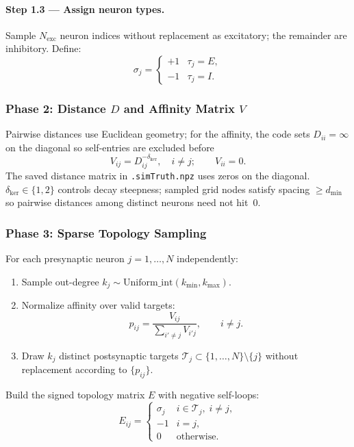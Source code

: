 \documentclass[11pt]{article}
\begin{document}
\paragraph{Step 1.3 --- Assign neuron types.}
Sample $N_{\text{exc}}$ neuron indices without replacement as
excitatory; the remainder are inhibitory. Define:
\begin{equation}
  \sigma_j =
  \begin{cases} +1 & \tau_j=E,\\ -1 & \tau_j=I.\end{cases}
\end{equation}

\subsubsection{Phase 2: Distance $D$ and Affinity Matrix $V$}

Pairwise distances use Euclidean geometry; for the affinity, the
code sets $D_{ii}=\infty$ on the diagonal so self-entries are excluded
before
\begin{equation}
  V_{ij}=D_{ij}^{-\delta_{\mathrm{ker}}},\quad i\neq j;\qquad
  V_{ii}=0.
  \label{eq:dist_kernel}
\end{equation}
The saved distance matrix in \texttt{.simTruth.npz} uses zeros on the
diagonal.
$\delta_{\mathrm{ker}}\in\{1,2\}$ controls decay steepness; sampled
grid nodes satisfy spacing $\ge d_{\text{min}}$ so pairwise distances
among distinct neurons need not hit~$0$.

\subsubsection{Phase 3: Sparse Topology Sampling}

For each presynaptic neuron $j=1,\dots,N$ independently:
\begin{enumerate}
  \item Sample out-degree
        $k_j\sim\mathrm{Uniform\_int}(k_{\text{min}},k_{\text{max}})$.
  \item Normalize affinity over valid targets:
  \begin{equation}
    p_{ij}=\frac{V_{ij}}{\sum_{i'\neq j}V_{i'j}},\qquad i\neq j.
  \end{equation}
  \item Draw $k_j$ distinct postsynaptic targets
        $\mathcal{T}_j\subset\{1,\dots,N\}\setminus\{j\}$ without
        replacement according to $\{p_{ij}\}$.
\end{enumerate}
Build the signed topology matrix $E$ with negative self-loops:
\begin{equation}
  E_{ij}=
  \begin{cases}
    \sigma_j & i\in\mathcal{T}_j,\;i\neq j,\\
    -1       & i=j,\\
    0        & \text{otherwise.}
  \end{cases}
  \label{eq:topology}
\end{equation}
\end{document}
